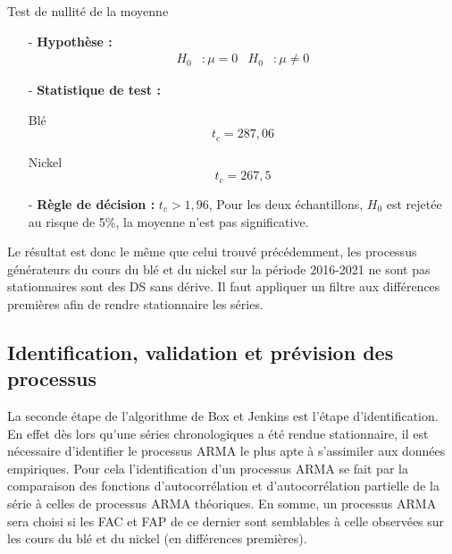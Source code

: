     Test de nullité de la moyenne
    \begin{itemize}
        \item[-]\textbf{Hypothèse :}
    \begin{align*}
        H_{0} &: \mu = 0 & H_{0} &: \mu \neq 0
    \end{align*}
    \item[-]\textbf{Statistique de test :}
    \begin{multicols}{2}
        \centering Blé
        \begin{equation*}
                t_{c} = 287,06
        \end{equation*}
    
        \columnbreak
    
        \centering Nickel
        \begin{equation*}
            t_{c} = 267,5
        \end{equation*}
        \end{multicols}
    \item[-]\textbf{Règle de décision :} $t_{c} > 1,96$, Pour les deux échantillons, $H_{0}$ est rejetée au risque de 5\%, la moyenne n'est pas significative.
    \end{itemize}
Le résultat est donc le même que celui trouvé précédemment, les processus générateurs du cours du blé et du nickel sur la période 2016-2021 ne sont pas stationnaires sont 
des DS sans dérive. Il faut appliquer un filtre aux différences premières afin de rendre stationnaire les séries.
\subsection{Identification, validation et prévision des processus}
La seconde étape de l'algorithme de Box et Jenkins est l'étape d'identification. En effet dès lors qu'une séries chronologiques a été rendue stationnaire, il est 
nécessaire d'identifier le processus ARMA le plus apte à s'assimiler aux données empiriques. Pour cela l'identification d'un processus ARMA se fait par la comparaison des 
fonctions d'autocorrélation et d'autocorrélation partielle de la série à celles de processus ARMA théoriques. En somme, un processus ARMA sera choisi si les FAC et FAP de 
ce dernier sont semblables à celle observées sur les cours du blé et du nickel (en différences premières).
